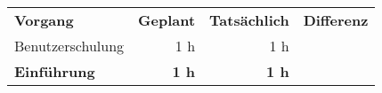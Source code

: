 \begin{tabular}{lrrr}
    \rowcolor{heading}\textbf{Vorgang} & \textbf{Geplant} & \textbf{Tatsächlich} & \textbf{Differenz} \\
    \rowcolor{odd}Benutzerschulung & 1 h & 1 h &  \\
    \hline
    \hline
    \rowcolor{heading}\textbf{Einführung} & \textbf{1 h} & \textbf{1 h} & \textbf{} \\
\end{tabular}
